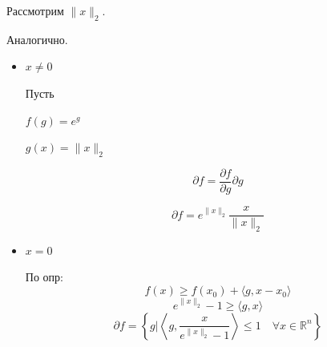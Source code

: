 \documentclass[a4paper,12pt]{article}
\newcommand{\lt}{\left}
\newcommand{\rt}{\right}
\newcommand{\p}{\partial}
\newcommand{\fr}{\frac}
\newcommand{\bb}{\mathbb}
\begin{document}
Рассмотрим $\|x\|_2$.

Аналогично.
\begin{itemize}
	\item $x \neq 0$
	
	Пусть 
	
	$f(g) = e^g$
	
	$g(x) = \|x\|_2$
	
	$$\p f = \fr{\p f}{\p g}\p g$$
	
	$$\p f = e^{\|x\|_2}\fr{x}{\|x\|_2}$$
	
	
	\item $x = 0$
	
	По опр:
	$$f(x)\ge f(x_0) + \langle g, x - x_0\rangle$$
	$$e^{\|x\|_2} - 1\ge \langle g, x\rangle$$
	$$\p f = \lt\{g\Big|  \lt\langle g, \fr{x}{e^{\|x\|_2} - 1}\rt\rangle \le 1 \quad \forall x\in \bb R^n \rt\}$$
	
\end{itemize}
\end{document}
